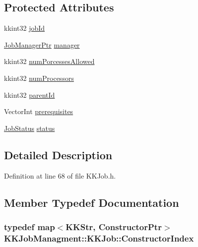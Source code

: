 \subsection*{Protected Attributes}
\begin{DoxyCompactItemize}
\item 
kkint32 \hyperlink{class_k_k_job_managment_1_1_k_k_job_a655535952219853be0aea068e60c974b}{job\+Id}
\item 
\hyperlink{namespace_k_k_job_managment_aa12a7270f9983ca4ed916533dc8adbc4}{Job\+Manager\+Ptr} \hyperlink{class_k_k_job_managment_1_1_k_k_job_a8924654ec92375dd89d6b60afb427c16}{manager}
\item 
kkint32 \hyperlink{class_k_k_job_managment_1_1_k_k_job_aac8edcaac05b4e6f9511a3f1dff7e0a8}{num\+Porcesses\+Allowed}
\item 
kkint32 \hyperlink{class_k_k_job_managment_1_1_k_k_job_a828964b409f07218424024e972d7d4ef}{num\+Processors}
\item 
kkint32 \hyperlink{class_k_k_job_managment_1_1_k_k_job_a2623203d948d2e6348f7edc572e6abb4}{parent\+Id}
\item 
Vector\+Int \hyperlink{class_k_k_job_managment_1_1_k_k_job_afdcceeddf9e01d31a2359901ad661b9b}{prerequisites}
\item 
\hyperlink{class_k_k_job_managment_1_1_k_k_job_afbd631ac794da7bbb00e0406ba89bac4}{Job\+Status} \hyperlink{class_k_k_job_managment_1_1_k_k_job_a7d47b57d658db4208037511f7f663be9}{status}
\end{DoxyCompactItemize}


\subsection{Detailed Description}


Definition at line 68 of file K\+K\+Job.\+h.



\subsection{Member Typedef Documentation}
\subsubsection[{\texorpdfstring{Constructor\+Index}{ConstructorIndex}}]{\setlength{\rightskip}{0pt plus 5cm}typedef map$<$K\+K\+Str, {\bf Constructor\+Ptr}$>$ {\bf K\+K\+Job\+Managment\+::\+K\+K\+Job\+::\+Constructor\+Index}}\hypertarget{class_k_k_job_managment_1_1_k_k_job_a95e80219c377acb27706c313c4d41827}{}\label{class_k_k_job_managment_1_1_k_k_job_a95e80219c377acb27706c313c4d41827}


